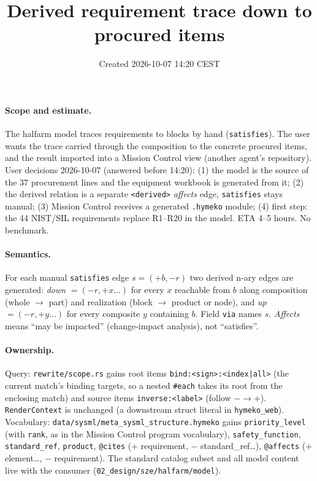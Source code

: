\documentclass[11pt,a4paper]{article}
\title{Derived requirement trace down to procured items}
\date{Created 2026-10-07 14:20 CEST}
\begin{document}
\maketitle
\paragraph{Scope and estimate.} The halfarm model traces requirements to blocks by hand
(\texttt{satisfies}). The user wants the trace carried through the composition to the concrete
procured items, and the result imported into a Mission Control view (another agent's repository).
User decisions 2026-10-07 (answered before 14:20): (1) the model is the source of the 37 procurement lines and the
equipment workbook is generated from it; (2) the derived relation is a separate \texttt{<derived>}
\emph{affects} edge, \texttt{satisfies} stays manual; (3) Mission Control receives a generated
\texttt{.hymeko} module; (4) first step: the 44 NIST/SIL requirements replace R1--R20 in the model.
ETA 4--5 hours. No benchmark.
\paragraph{Semantics.} For each manual \texttt{satisfies} edge $s = (+b, -r)$ two derived n-ary
edges are generated: \emph{down} $= (-r, +x \ldots)$ for every $x$ reachable from $b$ along
composition (whole $\to$ part) and realization (block $\to$ product or node), and \emph{up}
$= (-r, +y\ldots)$ for every composite $y$ containing $b$. Field \texttt{via} names $s$. \emph{Affects}
means ``may be impacted'' (change-impact analysis), not ``satisfies''.
\paragraph{Ownership.} Query: \texttt{rewrite/scope.rs} gains root items
\texttt{bind:<sign>:<index|all>} (the current match's binding targets, so a nested \texttt{\#each}
takes its root from the enclosing match) and source items \texttt{inverse:<label>} (follow
$-\to+$). \texttt{RenderContext} is unchanged (a downstream struct literal in \texttt{hymeko\_web}).
Vocabulary: \texttt{data/sysml/meta\_sysml\_structure.hymeko} gains \texttt{priority\_level} (with
\texttt{rank}, as in the Mission Control program vocabulary), \texttt{safety\_function},
\texttt{standard\_ref}, \texttt{product}, \texttt{@cites} (+ requirement, $-$ standard\_ref\ldots),
\texttt{@affects} (+ element\ldots, $-$ requirement). The standard catalog subset and all model
content live with the consumer (\texttt{02\_design/sze/halfarm/model}).
\end{document}
